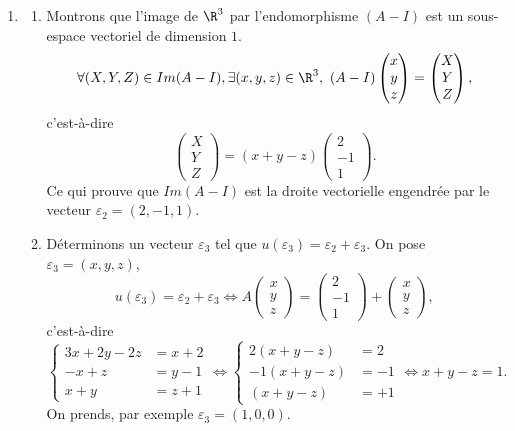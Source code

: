 {{\begin {enumerate}
Il existe des polyn\^omes $S$ et $R$, avec $d^{\circ}R<d^{\circ}P$ ou $R=0$, tels que 
$$Q(X)=S(X)(X-1)^2+R(X).$$
Notons $R(X)=aX+b$ ($R(X)$ est de degr\'e $1$ car $P$ est de degr\'e 2) et d\'erivons, on obtient
$$Q'(X)=S'(X)(X-1)^2+2(X-1)S(X)+a,$$
on a donc $Q(1)=R(1)=a+b$ et $Q'(1)=a$, c'est-\`a-dire $a=Q'(1)$ et $b=Q(1)-Q'(1)$ d'o\`u
$$R(X)=Q'(1)X+(Q(1)-Q'(1)).$$
D'apr\`es la question $2)$, on remarque que $P(A)=0$, en choisissant le polyn\^ome $Q(X)=X^n$ on a
$Q(1)=1$ et $Q'(1)=n$, donc 
$$Q(A)=A^n=R(A)=Q'(1)A+(Q(1)-Q'(1))I=nA+(1-n)I.$$ 
  \item
  \begin {enumerate}
    \item  Montrons que l'image de $\R^3$ par l'endomorphisme $(A-I)$ est un sous-espace vectoriel de dimension $1$.
$$\forall(X,Y,Z)\in Im (A-I), \exists (x,y,z)\in\R^3,\ (A-I)\begin{pmatrix}x \\  y \\  z\end{pmatrix}
=\begin{pmatrix}X \\  Y \\  Z\end{pmatrix},$$
c'est-\`a-dire
$$\begin{pmatrix}X \\  Y \\  Z\end{pmatrix}=(x+y-z)\begin{pmatrix}2 \\  -1 \\  1\end{pmatrix}.$$
Ce qui prouve que $Im(A-I)$ est la droite vectorielle engendr\'ee par le vecteur 
$\varepsilon_2=(2,-1,1)$.

    \item D\'eterminons un vecteur $\varepsilon_3$ tel que $u(\varepsilon_3)=\varepsilon_2+\varepsilon_3$.
On pose $\varepsilon_3=(x,y,z)$,
$$u(\varepsilon_3)=\varepsilon_2+\varepsilon_3\iff A\begin{pmatrix}x \\  y \\  z\end{pmatrix}
=\begin{pmatrix}2 \\  -1 \\  1\end{pmatrix}+\begin{pmatrix}x \\  y \\  z\end{pmatrix},$$
c'est-\`a-dire
$$\left\{\begin{aligned}3x+2y-2z &= x+2 \\  -x+z &=y-1 \\  x+y &=z+1\end{aligned}\right.\iff
\left\{\begin{aligned}2(x+y-z) &= 2 \\ -1(x+y-z) &=-1 \\  (x+y-z) &=+1\end{aligned}\right.\iff x+y-z=1.$$
On prends, par exemple $\varepsilon_3=(1,0,0)$.


\end{enumerate}
\end{enumerate}}}
